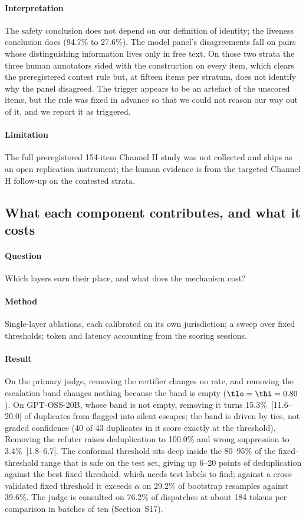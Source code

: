 \paragraph{Interpretation} The safety conclusion does not depend on our definition of identity; the liveness conclusion does (94.7\% to 27.6\%). The model panel's disagreements fall on pairs whose distinguishing information lives only in free text. On those two strata the three human annotators sided with the construction on every item, which clears the preregistered contest rule but, at fifteen items per stratum, does not identify why the panel disagreed. The trigger appears to be an artefact of the unscored items, but the rule was fixed in advance so that we could not reason our way out of it, and we report it as triggered.

\paragraph{Limitation} The full preregistered 154-item Channel H study was not collected and ships as an open replication instrument; the human evidence is from the targeted Channel H follow-up on the contested strata.

\subsection{What each component contributes, and what it costs}\label{sec:res-components}

\paragraph{Question} Which layers earn their place, and what does the mechanism cost?

\paragraph{Method} Single-layer ablations, each calibrated on its own jurisdiction; a sweep over fixed thresholds; token and latency accounting from the scoring sessions.

\paragraph{Result} On the primary judge, removing the certifier changes no rate, and removing the escalation band changes nothing because the band is empty ($\tlo=\thi=0.80$). On GPT-OSS-20B, whose band is not empty, removing it turns 15.3\%~[11.6--20.0] of duplicates from flagged into silent escapes; the band is driven by ties, not graded confidence (40 of 43 duplicates in it score exactly at the threshold). Removing the refuter raises deduplication to 100.0\% and wrong suppression to 3.4\%~[1.8--6.7]. The conformal threshold sits deep inside the 80--95\% of the fixed-threshold range that is safe on the test set, giving up 6--20 points of deduplication against the best fixed threshold, which needs test labels to find; against a cross-validated fixed threshold it exceeds $\alpha$ on 29.2\% of bootstrap resamples against 39.6\%. The judge is consulted on 76.2\% of dispatches at about 184 tokens per comparison in batches of ten (Section~S17).

